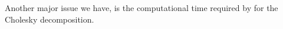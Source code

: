 Another major issue we have, is the computational time required by for the Cholesky decomposition. \medbreak
{}










